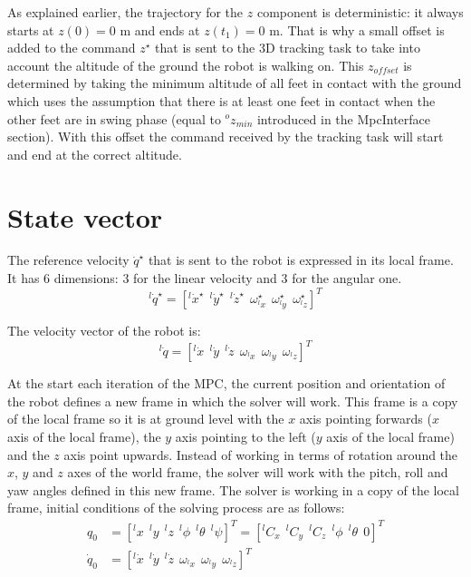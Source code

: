\documentclass[a4paper,11pt]{article}
\begin{document}
As explained earlier, the trajectory for the $z$ component is deterministic: it always starts at $z(0)=0$ m and ends at $z(t_1)=0$ m. That is why a small offset is added to the command $z^\star$ that is sent to the 3D tracking task to take into account the altitude of the ground the robot is walking on. This $z_{offset}$ is determined by taking the minimum altitude of all feet in contact with the ground which uses the assumption that there is at least one feet in contact when the other feet are in swing phase (equal to ${}^o\!z_{min}$ introduced in the MpcInterface section). With this offset the command received by the tracking task will start and end at the correct altitude.

\newpage
\section{State vector}


The reference velocity $\dot q^\star$ that is sent to the robot is expressed in its local frame. It has 6 dimensions: 3 for the linear velocity and 3 for the angular one.
\begin{equation}
{}^l\! \dot q^\star = [{}^l\! \dot x^\star ~~ {}^l\! \dot y^\star ~~ {}^l\! \dot z^\star ~~ \omega_{{}^l\!x}^\star ~~ \omega_{{}^l\!y}^\star ~~ \omega_{{}^l\!z}^\star ]^T
\end{equation}

The velocity vector of the robot is:
\begin{equation}
{}^l\! \dot q = [{}^l\! \dot x ~~ {}^l\! \dot y ~~ {}^l\! \dot z ~~ \omega_{{}^l\!x} ~~ \omega_{{}^l\!y} ~~ \omega_{{}^l\!z} ]^T
\end{equation}

At the start each iteration of the MPC, the current position and orientation of the robot defines a new frame in which the solver will work. This frame is a copy of the local frame so it is at ground level with the $x$ axis pointing forwards ($x$ axis of the local frame), the $y$ axis pointing to the left ($y$ axis of the local frame) and the $z$ axis point upwards. Instead of working in terms of rotation around the $x$, $y$ and $z$ axes of the world frame, the solver will work with the pitch, roll and yaw angles defined in this new frame. The solver is working in a copy of the local frame, initial conditions of the solving process are as follows:
\begin{align}
q_0 &= [{}^l\!x ~~ {}^l\!y ~~ {}^l\!z ~~ {}^l\! \phi ~~ {}^l\! \theta ~~ {}^l\! \psi ]^T = [ {}^l\!C_x ~~ {}^l\!C_y ~~ {}^l\!C_z ~~ {}^l\! \phi ~~ {}^l\! \theta ~~ 0]^T \\
\dot q_0 &= [{}^l\! \dot x ~~ {}^l\! \dot y ~~ {}^l\! \dot z ~~  \omega_{{}^l\!x} ~~ \omega_{{}^l\!y} ~~ \omega_{{}^l\!z} ]^T
\end{align}
\end{document}
